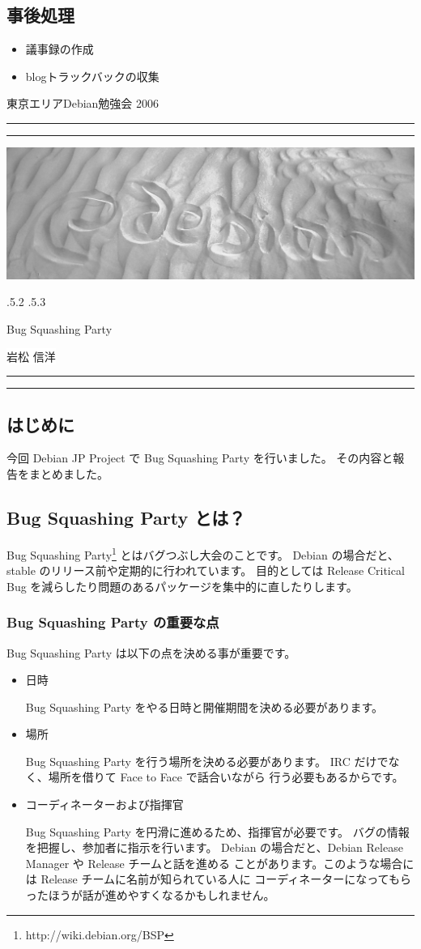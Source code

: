 \documentclass[mingoth,a4paper]{jsarticle}
\makeatletter
\renewcommand{\section}{\@startsection{section}{1}{\z@}%
    {\Cvs \@plus.5\Cdp \@minus.2\Cdp}%
    {.5\Cvs \@plus.3\Cdp}%
    {\normalfont\Huge\headfont\raggedright\centering}} %
\newcommand{\dancersection}[2]{%
\newpage
東京エリアDebian勉強会 2006
\hrule
\vspace{0.5mm}
\hrule
\hfill{}\includegraphics[width=16cm]{image2006-natsu/guruguru-sand-light.png}\\
\vspace{-5cm}
\begin{center}
\section{#1}
\end{center}
\hfill{}\colorbox{white}{#2}\hspace{3cm}\space\\
\vspace{1cm}
\hrule
\vspace{0.5mm}
\hrule
\vspace{1cm}
}
\makeatother
\begin{document}
\subsection{事後処理}

\begin{itemize}
 \item 議事録の作成
 \item blogトラックバックの収集
\end{itemize}

\newpage
\dancersection{Bug Squashing Party}{岩松 信洋}
\subsection{はじめに}
今回 Debian JP Project で Bug Squashing Party を行いました。
その内容と報告をまとめました。
 
\subsection{Bug Squashing Party とは？}
Bug Squashing Party\footnote{http://wiki.debian.org/BSP} とはバグつぶし大会のことです。
Debian の場合だと、stable のリリース前や定期的に行われています。
目的としては Release Critical Bug を減らしたり問題のあるパッケージを集中的に直したりします。

\subsubsection{Bug Squashing Party の重要な点}

Bug Squashing Party は以下の点を決める事が重要です。
\begin{itemize}
	\item 日時

		Bug Squashing Party をやる日時と開催期間を決める必要があります。
	\item 場所

		Bug Squashing Party を行う場所を決める必要があります。
		IRC だけでなく、場所を借りて Face to Face で話合いながら
		行う必要もあるからです。 
	\item コーディネーターおよび指揮官
		
		Bug Squashing Party を円滑に進めるため、指揮官が必要です。
		バグの情報を把握し、参加者に指示を行います。
		Debian の場合だと、Debian Release Manager や Release チームと話を進める
		ことがあります。このような場合には Release チームに名前が知られている人に
		コーディネーターになってもらったほうが話が進めやすくなるかもしれません。
\end{itemize}
\end{document}
